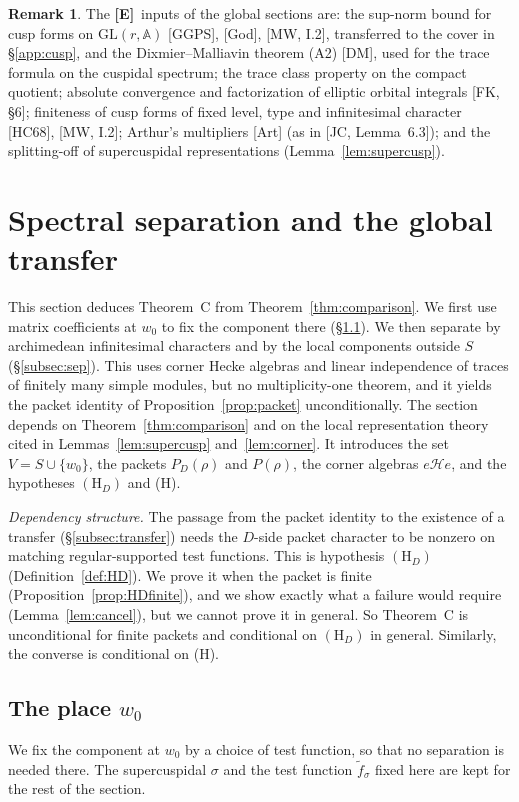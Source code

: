 \documentclass[12pt]{article}
\newcommand{\A}{\mathbb{A}}
\newcommand{\GL}{\mathrm{GL}}
\newcommand{\Ev}{\textbf{[E]}}
\theoremstyle{plain}
\theoremstyle{definition}
\newtheorem{remark}[theorem]{Remark}
\begin{document}
\begin{remark}\label{rem:Einputs}
The \Ev\ inputs of the global sections are: the sup-norm bound for cusp forms on $\GL(r,\A)$ [GGPS], [God], [MW, I.2], transferred to the cover in \S\ref{app:cusp}, and the Dixmier--Malliavin theorem (A2) [DM], used for the trace formula on the cuspidal spectrum; the trace class property on the compact quotient; absolute convergence and factorization of elliptic orbital integrals [FK, \S6]; finiteness of cusp forms of fixed level, type and infinitesimal character [HC68], [MW, I.2]; Arthur's multipliers [Art] (as in [JC, Lemma~6.3]); and the splitting-off of supercuspidal representations (Lemma~\ref{lem:supercusp}).
\end{remark}

\section{Spectral separation and the global transfer}\label{sec:spectral}
This section deduces Theorem~C from Theorem~\ref{thm:comparison}. We first use matrix coefficients at $w_0$ to fix the component there (\S\ref{subsec:w0}). We then separate by archimedean infinitesimal characters and by the local components outside $S$ (\S\ref{subsec:sep}). This uses corner Hecke algebras and linear independence of traces of finitely many simple modules, but no multiplicity-one theorem, and it yields the packet identity of Proposition~\ref{prop:packet} unconditionally. The section depends on Theorem~\ref{thm:comparison} and on the local representation theory cited in Lemmas~\ref{lem:supercusp} and~\ref{lem:corner}. It introduces the set $V=S\cup\{w_0\}$, the packets $P_D(\rho)$ and $P(\rho)$, the corner algebras $e\mathcal He$, and the hypotheses $(\mathrm H_D)$ and (H).

\emph{Dependency structure.} The passage from the packet identity to the existence of a transfer (\S\ref{subsec:transfer}) needs the $D$-side packet character to be nonzero on matching regular-supported test functions. This is hypothesis $(\mathrm H_D)$ (Definition~\ref{def:HD}). We prove it when the packet is finite (Proposition~\ref{prop:HDfinite}), and we show exactly what a failure would require (Lemma~\ref{lem:cancel}), but we cannot prove it in general. So Theorem~C is unconditional for finite packets and conditional on $(\mathrm H_D)$ in general. Similarly, the converse is conditional on (H).

\subsection{The place $w_0$}\label{subsec:w0}
We fix the component at $w_0$ by a choice of test function, so that no separation is needed there. The supercuspidal $\sigma$ and the test function $\tilde f_\sigma$ fixed here are kept for the rest of the section.
\end{document}
